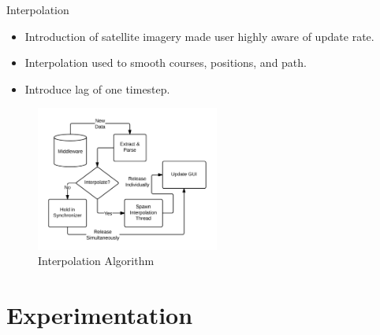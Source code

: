 \documentclass{beamer}
\begin{document}
    \begin{frame}{Interpolation}
          \begin{itemize} \footnotesize
            \item Introduction of satellite imagery made user highly aware of update rate.
            \item Interpolation used to smooth courses, positions, and path.
            \item Introduce lag of one timestep.
          \end{itemize}
          \vspace{-20pt}
          \begin{figure}[ht] \centering
            \includegraphics[width=6cm] {../graphics/middleware_diagram.png}
            \caption{\footnotesize Interpolation Algorithm}
          \end{figure}

    \end{frame}



\section{Experimentation}
\end{document}
